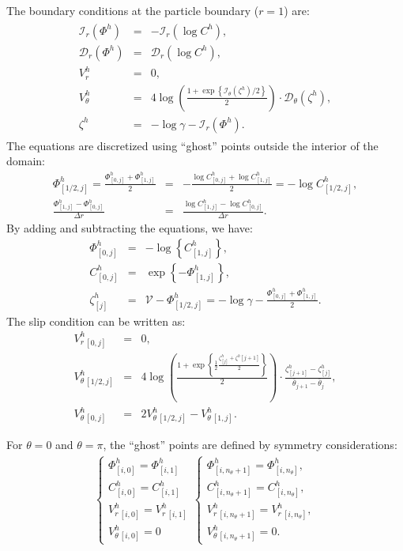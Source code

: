 \documentclass[10pt]{ijnam}
\newcommand{\brc}[2]{\left\{\begin{array}{#1}#2\end{array}\right.}
\newcommand{\pars}[1]{\left(#1\right)}
\newcommand{\brcs}[1]{\left\{#1\right\}}
\newcommand\cI{\mathcal{I}}
\newcommand\cD{\mathcal{D}}
\newcommand\cV{\mathscr{V}}
\begin{document}
The boundary conditions at the particle boundary ($r=1$) are:
\begin{eqnarray*}
\begin{array}{rcl}
\cI_r(\varPhi^h) &=& -\cI_r(\log C^h), \\
\cD_r(\varPhi^h) &=& \cD_r(\log C^h), \\
V^h_r &=& 0, \\
V^h_\theta &=& 4\log\pars{\frac{1 + \exp\left\{\cI_\theta(\zeta^h)/2\right\}}{2}} \cdot 
			\cD_\theta(\zeta^h), \\
  \zeta^h &=& - \log \gamma - \cI_r(\varPhi^h).
\end{array}
\end{eqnarray*}
The equations are discretized using ``ghost'' points outside the interior of the domain:
\begin{eqnarray*}
 \varPhi^h_{[1/2, j]} = \frac{\varPhi^h_{[0,j]} + \varPhi^h_{[1,j]}}{2} &=& 
	-\frac{\log C^h_{[0,j]} + \log C^h_{[1,j]}}{2} = -\log C^h_{[1/2, j]}, \\
  \frac{\varPhi^h_{[1,j]} - \varPhi^h_{[0,j]}}{\Delta r} &=& 
	\frac{\log C^h_{[1,j]} - \log C^h_{[0,j]}}{\Delta r}. 
\end{eqnarray*}
By adding and subtracting the equations, we have:
\begin{eqnarray*}
\varPhi^h_{[0,j]} &=& -\log\brcs{C^h_{[1,j]}}, \\
C^h_{[0,j]} &=& \exp\brcs{-\varPhi^h_{[1,j]}}, \\
  \zeta^h_{[j]} &=& \cV - \varPhi^h_{[1/2,j]}
                     = -\log\gamma -\frac{\varPhi^h_{[0,j]} + \varPhi^h_{[1,j]}}{2}.
\end{eqnarray*}
The slip condition can be written as:
\begin{eqnarray*}
V_r^h{}_{[0,j]} &=& 0, \\
V_\theta^h{}_{[1/2,j]} &=& 
4\log\pars{\frac{1 + \exp\left\{\frac{1}{2}
 \frac{\zeta^h_{[j]} + \zeta^h[j+1]}{2}\right\}}{2}} 
\cdot \frac{\zeta^h_{[j+1]} - \zeta^h_{[j]}}{\bar{\theta}_{j+1} - \bar{\theta}_{j}}, \\
  V^h_\theta{}_{[0,j]} &=& 2 V^h_\theta{}_{[1/2, j]} - V^h_\theta{}_{[1,j]}.
\end{eqnarray*}

For $\theta = 0$ and $\theta = \pi$, the ``ghost'' points are defined by symmetry considerations:
\begin{eqnarray*} 
\brc{l}{
\varPhi^h_{[i, 0]} = \varPhi^h_{[i, 1]} \\
C^h_{[i, 0]} = C^h_{[i, 1]} \\
V_r^h{}_{[i, 0]} = V_r^h{}_{[i, 1]} \\
V_\theta^h{}_{[i, 0]} = 0
} 
\brc{l}{
\varPhi^h_{[i, n_\theta+1]} = \varPhi^h_{[i, n_\theta]}, \\
C^h_{[i, n_\theta+1]} = C^h_{[i, n_\theta]}, \\
V_r^h{}_{[i, n_\theta+1]} = V_r^h{}_{[i, n_\theta]}, \\
V_\theta^h{}_{[i, n_\theta+1]} = 0.
} 
\end{eqnarray*}
\end{document}
